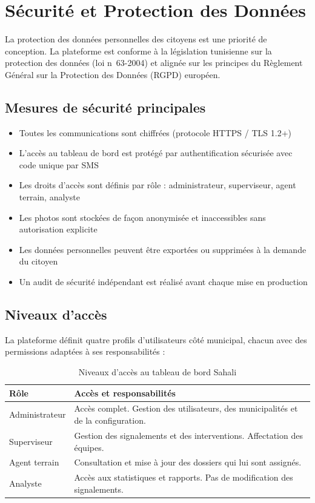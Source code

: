 \documentclass[12pt, a4paper]{article}
\begin{document}
\section{Sécurité et Protection des Données}

La protection des données personnelles des citoyens est une priorité de conception. La plateforme est conforme à la législation tunisienne sur la protection des données (loi n\textdegree~63-2004) et alignée sur les principes du Règlement Général sur la Protection des Données (RGPD) européen.

\subsection{Mesures de sécurité principales}

\begin{itemize}[leftmargin=*]
  \item Toutes les communications sont chiffrées (protocole HTTPS / TLS 1.2+)
  \item L'accès au tableau de bord est protégé par authentification sécurisée avec code unique par SMS
  \item Les droits d'accès sont définis par rôle : administrateur, superviseur, agent terrain, analyste
  \item Les photos sont stockées de façon anonymisée et inaccessibles sans autorisation explicite
  \item Les données personnelles peuvent être exportées ou supprimées à la demande du citoyen
  \item Un audit de sécurité indépendant est réalisé avant chaque mise en production

\end{itemize}

\subsection{Niveaux d'accès}

La plateforme définit quatre profils d'utilisateurs côté municipal, chacun avec des permissions adaptées à ses responsabilités :

\begin{table}[h!]
\centering
\begin{tabularx}{\textwidth}{lX}
\toprule
\textbf{Rôle} & \textbf{Accès et responsabilités} \\
\midrule
Administrateur  & Accès complet. Gestion des utilisateurs, des municipalités et de la configuration. \\
Superviseur     & Gestion des signalements et des interventions. Affectation des équipes. \\
Agent terrain   & Consultation et mise à jour des dossiers qui lui sont assignés. \\
Analyste        & Accès aux statistiques et rapports. Pas de modification des signalements. \\
\bottomrule
\end{tabularx}
\caption{Niveaux d'accès au tableau de bord Sahali}
\end{table}
\end{document}
